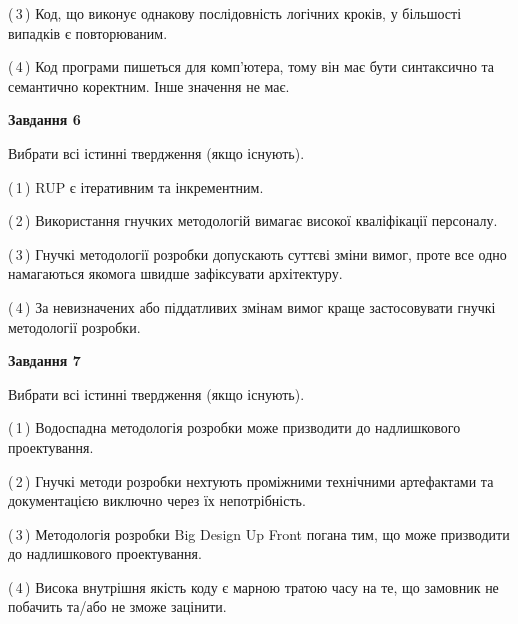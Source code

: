 \documentclass[10pt, ukrainian]{article}
\begin{document}
{\begin {large}
(\,3\,) Код, що виконує однакову послідовність логічних кроків, у більшості випадків є повторюваним.%



(\,4\,) Код програми пишеться для комп'ютера, тому він має бути синтаксично та семантично коректним. Інше значення не має. %

\newpage

{\begin {center}\textbf{Завдання 6}\end {center}}\par
Вибрати всі істинні твердження (якщо існують).\par
\vspace{2mm}



(\,1\,) RUP є ітеративним та інкрементним.%



(\,2\,) Використання гнучких методологій вимагає високої кваліфікації персоналу. %



(\,3\,) Гнучкі методології розробки допускають суттєві зміни вимог, проте все одно намагаються якомога швидше зафіксувати архітектуру. %



(\,4\,) За невизначених або піддатливих змінам вимог краще застосовувати гнучкі методології розробки. %


{\begin {center}\textbf{Завдання 7}\end {center}}\par
Вибрати всі істинні твердження (якщо існують).\par
\vspace{2mm}



(\,1\,) Водоспадна методологія розробки може призводити до надлишкового проектування. %



(\,2\,) Гнучкі методи розробки нехтують проміжними технічними артефактами та документацією виключно через їх непотрібність. %



(\,3\,) Методологія розробки Big Design Up Front погана тим, що може призводити до надлишкового проектування. %



(\,4\,) Висока внутрішня якість коду є марною тратою часу на те, що замовник не побачить та/або не зможе зацінити. %



\end{large}}
\end{document}
